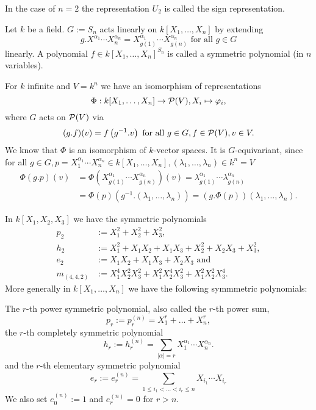 \begin{rem}
 In the case of $n = 2$ the representation $U_2$ is called the sign representation.
\end{rem}


\begin{defi}
 Let $k$ be a field. $G := S_n$ acts linearly on $k[X_1, \ldots, X_n]$ by extending
 \[
  g.X^{\alpha_1} \cdots X_n^{\alpha_n} = X_{g(1)}^{\alpha_1} \cdots X_{g(n)}^{\alpha_n} \text{ for all } g \in G
 \]
 linearly. A polynomial $f \in k[X_1, \ldots, X_n]^{S_n}$ is called a symmetric polynomial (in $n$ variables).
\end{defi}


\begin{rem}
 For $k$ infinite and $V = k^n$ we have an isomorphism of representations
 \[
  \Phi : k[X_1, \ldots, X_n] \to \mathcal{P}(V), X_i \mapsto \varphi_i,
 \]
 where $G$ acts on $\mathcal{P}(V)$ via
 \[
  (g.f)(v) = f\left( g^{-1}.v \right) \text{ for all } g \in G, f \in \mathcal{P}(V), v \in V.
 \]
 We know that $\Phi$ is an isomorphism of $k$-vector spaces. It is $G$-equivariant, since for all $g \in G, p = X_1^{\alpha_1} \cdots X_n^{\alpha_n} \in k[X_1, \ldots, X_n], (\lambda_1, \ldots, \lambda_n) \in k^n = V$
 \begin{align*}
  \Phi(g.p)(v)
  &= \Phi\left( X_{g(1)}^{\alpha_1} \cdots X_{g(n)}^{\alpha_n} \right)(v)
  = \lambda_{g(1)}^{\alpha_1} \cdots \lambda_{g(n)}^{\alpha_n} \\
  &= \Phi(p)\left( g^{-1}.(\lambda_1, \ldots, \lambda_n) \right)
  = (g.\Phi(p))(\lambda_1, \ldots, \lambda_n).
 \end{align*}
\end{rem}

\begin{expl}
 In $k[X_1, X_2, X_3]$ we have the symmetric polynomials
 \begin{align*}
  p_2 &:= X_1^2 + X_2^2 + X_3^2, \\
  h_2 &:= X_1^2 + X_1 X_2 + X_1 X_3 + X_2^2 + X_2 X_3 + X_3^2, \\
  e_2 &:= X_1 X_2 + X_1 X_3 + X_2 X_3 \text{ and} \\
  m_{(4,4,2)} &:= X_1^4 X_2^2 X_3^2 + X_1^2 X_2^4 X_3^2 + X_1^2 X_2^2 X_3^4.
 \end{align*}
 More generally in $k[X_1, \ldots, X_n]$ we have the following symmmetric polynomials:

 The $r$-th power symmetric polynomial, also called the $r$-th power sum,
 \[
  p_r := p_r^{(n)} = X_1^r + \ldots + X_n^r,
 \]
 the $r$-th completely symmetric polynomial
 \[
  h_r := h_r^{(n)} = \sum_{|\alpha|=r} X_1^{\alpha_1} \cdots X_n^{\alpha_n}.
 \]
 and the $r$-th elementary symmetric polynomial
 \[
  e_r := e_r^{(n)} = \sum_{1 \leq i_1 < \ldots < i_r \leq n} X_{i_1} \cdots X_{i_r}
 \]
 We also set $e_0^{(n)} := 1$ and $e_r^{(n)} = 0$ for $r > n$.
\end{expl}









